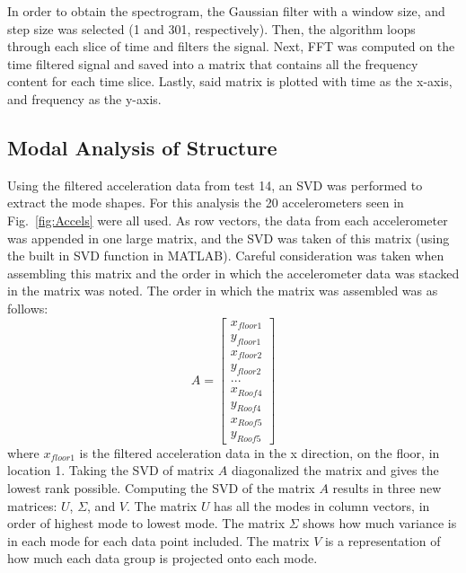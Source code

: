 \documentclass{article}
\begin{document}
\medskip

In order to obtain the spectrogram, the Gaussian filter with a window size, and step size was selected (1 and 301, respectively). Then, the algorithm loops through each slice of time and filters the signal. Next, FFT was computed on the time filtered signal and saved into a matrix that contains all the frequency content for each time slice. Lastly, said matrix is plotted with time as the x-axis, and frequency as the y-axis.

\subsection{Modal Analysis of Structure}

Using the filtered acceleration data from test 14, an SVD was performed to extract the mode shapes. For this analysis the 20 accelerometers seen in Fig.\ \ref{fig:Accels} were all used. As row vectors, the data from each accelerometer was appended in one large matrix, and the SVD was taken of this matrix (using the built in SVD function in MATLAB). Careful consideration was taken when assembling this matrix and the order in which the accelerometer data was stacked in the matrix was noted. The order in which the matrix was assembled was as follows: 
\begin{equation}
    A = \begin{bmatrix}
    x_{floor1} \\
    y_{floor1} \\
    x_{floor2} \\
    y_{floor2} \\
    ... \\
    x_{Roof4} \\
    y_{Roof4} \\
    x_{Roof5} \\
    y_{Roof5} 
    \end{bmatrix}
\end{equation}
where $x_{floor1}$ is the filtered acceleration data in the x direction, on the floor, in location 1. Taking the SVD of matrix $A$ diagonalized the matrix and gives the lowest rank possible. Computing the SVD of the matrix $A$ results in three new matrices: $U$, $\Sigma$, and $V$. The matrix $U$ has all the modes in column vectors, in order of highest mode to lowest mode. The matrix $\Sigma$ shows how much variance is in each mode for each data point included. The matrix $V$ is a representation of how much each data group is projected onto each mode. 
\end{document}
